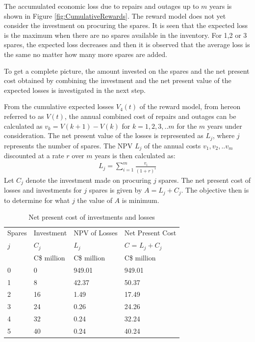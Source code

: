 \documentclass[letterpaper, 12pt]{article}
\begin{document}
The accumulated economic loss due to repairs and outages up to $m$ years is shown in Figure \ref{fig:CumulativeRewards}. The reward model does not yet consider the investment on procuring the spares. It is seen that the expected loss is the maximum when there are no spares available in the inventory. For 1,2 or 3 spares, the expected loss decreases and then it is observed that the average loss is the same no matter how many more spares are added.

To get a complete picture, the amount invested on the spares and the net present cost obtained by combining the investment and the net present value of the expected losses is investigated in the next step.

From the cumulative expected losses $V_4(t)$ of the reward model, from hereon referred to as $V(t)$, the annual combined cost of repairs and outages can be calculated as $v_k=V(k+1) - V(k)$ for $k=1,2,3,..m$ for the $m$ years under consideration. The net present value of the losses is represented as $L_j$, where $j$ represents the number of spares. The NPV $L_j$ of the annual costs $v_1, v_2,..v_m$ discounted at a rate $r$ over $m$ years is then calculated as:
\begin{align}
L_j = \sum_{i=1}^m \frac{v_i}{(1+r)^i}
\end{align}
Let $C_j$ denote the investment made on procuring $j$ spares. The net present cost of losses and investments for $j$ spares is given by $A=L_j + C_{j}$. The objective then is to determine for what $j$ the value of $A$ is minimum.



\begin{table}[!h]\centering
\caption{Net present cost of investments and losses\label{tbl:SparesPresentCost}}
\begin{tabular}{l l l l}
\hline
Spares	&	Investment	&	NPV of Losses	&	Net Present Cost	\\
$j$	&	$C_j$	&	$L_j$	&	$C$ = $L_j+C_j$	\\
	& C\$ million & C\$ million & C\$ million \\
	\hline
0	&	0	&	949.01	&	949.01	\\
1	&	8	&	42.37	&	50.37	\\
2	&	16	&	1.49	&	17.49	\\
3	&	24	&	0.26	&	24.26	\\
4	&	32	&	0.24	&	32.24	\\
5	&	40	&	0.24	&	40.24	\\
\hline							
\end{tabular}
\end{table}						
\end{document}
